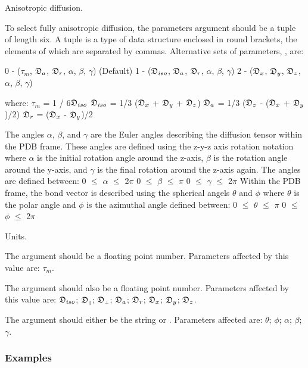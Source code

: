 Anisotropic diffusion.

To select fully anisotropic diffusion, the parameters argument should be a tuple of length
six.  A tuple is a type of data structure enclosed in round brackets, the elements of which
are separated by commas.  Alternative sets of parameters, 
, are:

    0 - ($\tau_m$, $\mathfrak{D}_a$, $\mathfrak{D}_r$, $\alpha$, $\beta$, $\gamma$)   (Default)
    1 - ($\mathfrak{D}_{iso}$, $\mathfrak{D}_a$, $\mathfrak{D}_r$, $\alpha$, $\beta$, $\gamma$)
    2 - ($\mathfrak{D}_x$, $\mathfrak{D}_y$, $\mathfrak{D}_z$, $\alpha$, $\beta$, $\gamma$)

where:
    $\tau_m$ = 1 / 6$\mathfrak{D}_{iso}$
    $\mathfrak{D}_{iso}$ = 1/3 ($\mathfrak{D}_x$ + $\mathfrak{D}_y$ + $\mathfrak{D}_z$)
    $\mathfrak{D}_a$ = 1/3 ($\mathfrak{D}_z$ - ($\mathfrak{D}_x$ + $\mathfrak{D}_y$)/2)
    $\mathfrak{D}_r$ = ($\mathfrak{D}_x$ - $\mathfrak{D}_y$)/2

The angles $\alpha$, $\beta$, and $\gamma$ are the Euler angles describing the diffusion tensor
within the PDB frame.  These angles are defined using the z-y-z axis rotation notation where
$\alpha$ is the initial rotation angle around the z-axis, $\beta$ is the rotation angle around the
y-axis, and $\gamma$ is the final rotation around the z-axis again.  The angles are defined
between:
    0 $\le$ $\alpha$ $\le$ 2$\pi$
    0 $\le$ $\beta$ $\le$ $\pi$
    0 $\le$ $\gamma$ $\le$ 2$\pi$
Within the PDB frame, the bond vector is described using the spherical angels $\theta$ and $\phi$
where $\theta$ is the polar angle and $\phi$ is the azimuthal angle defined between:
    0 $\le$ $\theta$ $\le$ $\pi$
    0 $\le$ $\phi$ $\le$ 2$\pi$


Units.

The 
 argument should be a floating point number.  Parameters affected by this
value are:  $\tau_m$.

The 
 argument should also be a floating point number.  Parameters affected by this
value are:  $\mathfrak{D}_{iso}$; $\mathfrak{D}_{\scriptscriptstyle \parallel}$; $\mathfrak{D}_{\scriptscriptstyle \perp}$; $\mathfrak{D}_a$; $\mathfrak{D}_r$; $\mathfrak{D}_x$; $\mathfrak{D}_y$; $\mathfrak{D}_z$.

The 
 argument should either be the string 
 or 
.  Parameters affected
are:  $\theta$; $\phi$; $\alpha$; $\beta$; $\gamma$.



\subsubsection{Examples}

